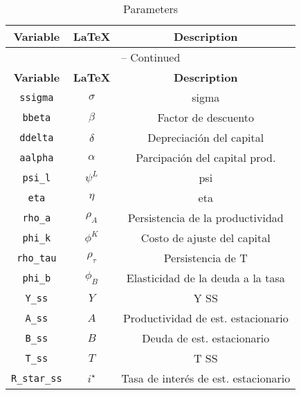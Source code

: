 \begin{center}
\begin{longtable}{ccc}
\caption{Parameters}\\%
\hline%
\multicolumn{1}{c}{\textbf{Variable}} &
\multicolumn{1}{c}{\textbf{\LaTeX}} &
\multicolumn{1}{c}{\textbf{Description}}\\%
\hline\hline%
\endfirsthead
\multicolumn{3}{c}{{\tablename} \thetable{} -- Continued}\\%
\hline%
\multicolumn{1}{c}{\textbf{Variable}} &
\multicolumn{1}{c}{\textbf{\LaTeX}} &
\multicolumn{1}{c}{\textbf{Description}}\\%
\hline\hline%
\endhead
\texttt{ssigma} & $\sigma$ & sigma\\
\texttt{bbeta} & $\beta$ & Factor de descuento\\
\texttt{ddelta} & $\delta$ & Depreciación del capital\\
\texttt{aalpha} & $\alpha$ & Parcipación del capital prod.\\
\texttt{psi\_l} & $\psi^L$ & psi\\
\texttt{eta} & $\eta$ & eta\\
\texttt{rho\_a} & $\rho_{A}$ & Persistencia de la productividad\\
\texttt{phi\_k} & $\phi^{K}$ & Costo de ajuste del capital\\
\texttt{rho\_tau} & $\rho_{\tau}$ & Persistencia de T\\
\texttt{phi\_b} & $\phi_{B}$ & Elasticidad de la deuda a la tasa\\
\texttt{Y\_ss} & $Y$ & Y SS\\
\texttt{A\_ss} & $A$ & Productividad de est. estacionario\\
\texttt{B\_ss} & $B$ & Deuda de est. estacionario\\
\texttt{T\_ss} & $T$ & T SS\\
\texttt{R\_star\_ss} & $i^{\star}$ & Tasa de interés de est. estacionario\\
\hline%
\end{longtable}
\end{center}
